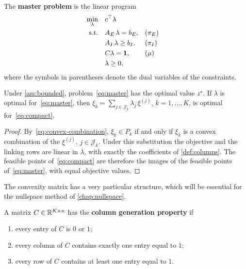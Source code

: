 \begin{definition} \label{def:master}
The \textbf{master problem} is the linear program
\begin{subequations} \label{eq:master}
\begin{align}
\min_{\lambda} \quad & c^\top \lambda \\
\text{s.t.} \quad & A_E\,\lambda = b_E, && (\pi_E) \label{eq:master-eq}\\
& A_I\,\lambda \ge b_I, && (\pi_I) \label{eq:master-ineq}\\
& C\lambda = \mathbf{1}, && (\mu) \label{eq:master-conv}\\
& \lambda \ge 0, \label{eq:master-nonneg}
\end{align}
\end{subequations}
where the symbols in parentheses denote the dual variables of the constraints.
\end{definition}

\begin{theorem} \label{thm:dw}
Under \cref{ass:bounded}, problem~\eqref{eq:master} has the optimal value $z^\star$. If
$\lambda$ is optimal for~\eqref{eq:master}, then $\xi_k = \sum_{j\in\mathcal{J}_k}\lambda_j\,
\xi^{(j)}$, $k=1,\dots,K$, is optimal for~\eqref{eq:compact}.
\end{theorem}

\begin{proof}
By~\eqref{eq:convex-combination}, $\xi_k\in P_k$ if and only if $\xi_k$ is a convex combination
of the $\xi^{(j)}$, $j\in\mathcal{J}_k$. Under this substitution the objective and the
linking rows are linear in $\lambda$, with exactly the coefficients of \cref{def:columns}.
The feasible points of~\eqref{eq:compact} are therefore the images of the feasible points
of~\eqref{eq:master}, with equal objective values. 
\end{proof}

The convexity matrix has a very particular structure, which will be essential for the
nullspace method of \cref{chap:nullspace}.

\begin{definition} \label{def:cg-property}
A matrix $C\in\mathbb{R}^{K\times n}$ has the \textbf{column generation property} if
\begin{enumerate}
    \item \label{def:cg-property:i} every entry of $C$ is $0$ or $1$;
    \item \label{def:cg-property:ii} every column of $C$ contains exactly one entry equal to $1$;
    \item \label{def:cg-property:iii} every row of $C$ contains at least one entry equal to $1$.
\end{enumerate}
\end{definition}

